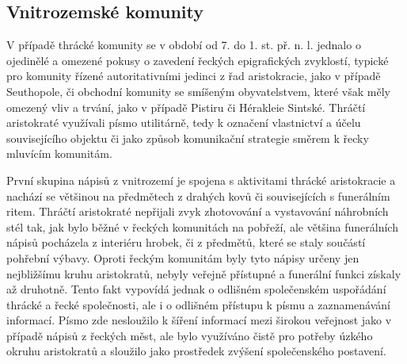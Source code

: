\subsection[vnitrozemské-komunity]{Vnitrozemské komunity}

V případě thrácké komunity se v období od 7. do 1. st. př. n. l. jednalo o ojedinělé a omezené pokusy o zavedení řeckých epigrafických zvyklostí, typické pro komunity řízené autoritativními jedinci z řad aristokracie, jako v případě Seuthopole, či obchodní komunity se smíšeným obyvatelstvem, které však měly omezený vliv a trvání, jako v případě Pistiru či Hérakleie Sintské. Thráčtí aristokraté využívali písmo utilitárně, tedy k označení vlastnictví a účelu souvisejícího objektu či jako způsob komunikační strategie směrem k řecky mluvícím komunitám.

První skupina nápisů z vnitrozemí je spojena s aktivitami thrácké aristokracie a nachází se většinou na předmětech z drahých kovů či souvisejících s funerálním ritem. Thráčtí aristokraté nepřijali zvyk zhotovování a vystavování náhrobních stél tak, jak bylo běžné v řeckých komunitách na pobřeží, ale většina funerálních nápisů pocházela z interiéru hrobek, či z předmětů, které se staly součástí pohřební výbavy. Oproti řeckým komunitám byly tyto nápisy určeny jen nejbližšímu kruhu aristokratů, nebyly veřejně přístupné a funerální funkci získaly až druhotně. Tento fakt vypovídá jednak o odlišném společenském uspořádání thrácké a řecké společnosti, ale i o odlišném přístupu k písmu a zaznamenávání informací. Písmo zde nesloužilo k šíření informací mezi širokou veřejnost jako v případě nápisů z řeckých měst, ale bylo využíváno čistě pro potřeby úzkého okruhu aristokratů a sloužilo jako prostředek zvýšení společenského postavení.

